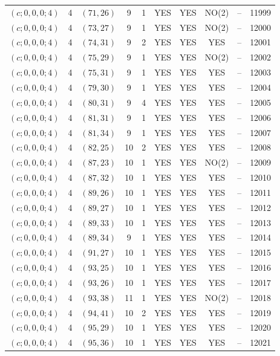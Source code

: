 \begin{longtable}{|c|c|c|c|c|c|c|c|c|c|}
$(c; 0, 0, 0; 4)$ & 4 & $(71, 26)$ & 9 & 1 & YES & YES & NO(2) & -- & 11999\\
$(c; 0, 0, 0; 4)$ & 4 & $(73, 27)$ & 9 & 1 & YES & YES & NO(2) & -- & 12000\\
$(c; 0, 0, 0; 4)$ & 4 & $(74, 31)$ & 9 & 2 & YES & YES & YES & -- & 12001\\
$(c; 0, 0, 0; 4)$ & 4 & $(75, 29)$ & 9 & 1 & YES & YES & NO(2) & -- & 12002\\
$(c; 0, 0, 0; 4)$ & 4 & $(75, 31)$ & 9 & 1 & YES & YES & YES & -- & 12003\\
$(c; 0, 0, 0; 4)$ & 4 & $(79, 30)$ & 9 & 1 & YES & YES & YES & -- & 12004\\
$(c; 0, 0, 0; 4)$ & 4 & $(80, 31)$ & 9 & 4 & YES & YES & YES & -- & 12005\\
$(c; 0, 0, 0; 4)$ & 4 & $(81, 31)$ & 9 & 1 & YES & YES & YES & -- & 12006\\
$(c; 0, 0, 0; 4)$ & 4 & $(81, 34)$ & 9 & 1 & YES & YES & YES & -- & 12007\\
$(c; 0, 0, 0; 4)$ & 4 & $(82, 25)$ & 10 & 2 & YES & YES & YES & -- & 12008\\
$(c; 0, 0, 0; 4)$ & 4 & $(87, 23)$ & 10 & 1 & YES & YES & NO(2) & -- & 12009\\
$(c; 0, 0, 0; 4)$ & 4 & $(87, 32)$ & 10 & 1 & YES & YES & YES & -- & 12010\\
$(c; 0, 0, 0; 4)$ & 4 & $(89, 26)$ & 10 & 1 & YES & YES & YES & -- & 12011\\
$(c; 0, 0, 0; 4)$ & 4 & $(89, 27)$ & 10 & 1 & YES & YES & YES & -- & 12012\\
$(c; 0, 0, 0; 4)$ & 4 & $(89, 33)$ & 10 & 1 & YES & YES & YES & -- & 12013\\
$(c; 0, 0, 0; 4)$ & 4 & $(89, 34)$ & 9 & 1 & YES & YES & YES & -- & 12014\\
$(c; 0, 0, 0; 4)$ & 4 & $(91, 27)$ & 10 & 1 & YES & YES & YES & -- & 12015\\
$(c; 0, 0, 0; 4)$ & 4 & $(93, 25)$ & 10 & 1 & YES & YES & YES & -- & 12016\\
$(c; 0, 0, 0; 4)$ & 4 & $(93, 26)$ & 10 & 1 & YES & YES & YES & -- & 12017\\
$(c; 0, 0, 0; 4)$ & 4 & $(93, 38)$ & 11 & 1 & YES & YES & NO(2) & -- & 12018\\
$(c; 0, 0, 0; 4)$ & 4 & $(94, 41)$ & 10 & 2 & YES & YES & YES & -- & 12019\\
$(c; 0, 0, 0; 4)$ & 4 & $(95, 29)$ & 10 & 1 & YES & YES & YES & -- & 12020\\
$(c; 0, 0, 0; 4)$ & 4 & $(95, 36)$ & 10 & 1 & YES & YES & YES & -- & 12021\\

\end{longtable}

